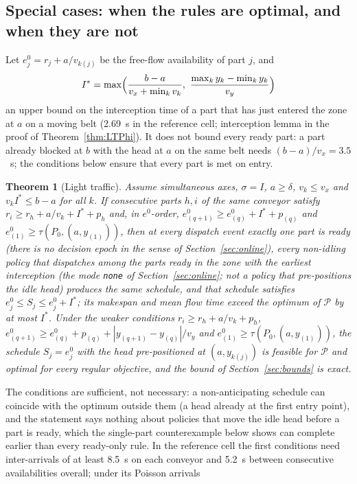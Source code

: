 \documentclass[11pt,a4paper]{article}
\theoremstyle{plain}
\newtheorem{theorem}{Theorem}
\theoremstyle{definition}
\theoremstyle{remark}
\newcommand{\Pb}{\mathcal{P}}
\begin{document}
\subsection{Special cases: when the rules are optimal, and when they are not}\label{sec:special}
Let $e^0_j=r_j+a/v_{k(j)}$ be the free-flow availability of part $j$, and
\[
I^\ast=\max\Bigl(\frac{b-a}{v_x+\min_kv_k},\ \frac{\max_ky_k-\min_ky_k}{v_y}\Bigr)
\]
an upper bound on the interception time of a part that has just entered the zone at $a$
on a moving belt (2.69~s in the reference cell; interception lemma in the proof of
Theorem~\ref{thm:LTPhi}). It does not bound every ready part: a part already blocked at
$b$ with the head at $a$ on the same belt needs $(b-a)/v_x=3.5$~s; the conditions below
ensure that every part is met on entry.
\begin{theorem}[Light traffic]\label{thm:light}
Assume simultaneous axes, $\sigma=I$, $a\ge\delta$, $v_k\le v_x$ and $v_kI^\ast\le b-a$ for
all $k$. If consecutive parts $h,i$ of the same conveyor satisfy
$r_i\ge r_h+a/v_k+I^\ast+p_h$ and, in $e^0$-order, $e^0_{(q+1)}\ge e^0_{(q)}+I^\ast+p_{(q)}$
and $e^0_{(1)}\ge\tau(P_0,(a,y_{(1)}))$, then at every dispatch event exactly one part is
ready (there is no decision epoch in the sense of Section~\ref{sec:online}), every non-idling policy that dispatches among the parts ready in the zone with the
earliest interception (the mode \texttt{none} of Section~\ref{sec:online}; not a policy
that pre-positions the idle head) produces the same schedule, and that schedule satisfies
$e^0_j\le S_j\le e^0_j+I^\ast$; its makespan and mean flow time exceed the optimum of $\Pb$
by at most $I^\ast$. Under the weaker conditions $r_i\ge r_h+a/v_k+p_h$,
$e^0_{(q+1)}\ge e^0_{(q)}+p_{(q)}+|y_{(q+1)}-y_{(q)}|/v_y$ and
$e^0_{(1)}\ge\tau(P_0,(a,y_{(1)}))$, the schedule $S_j=e^0_j$ with
the head pre-positioned at $(a,y_{k(j)})$ is feasible for $\Pb$ and optimal for every
regular objective, and the bound of Section~\ref{sec:bounds} is exact.
\end{theorem}
The conditions are sufficient, not necessary: a non-anticipating schedule can coincide
with the optimum outside them (a head already at the first entry point), and the
statement says nothing about policies that move the idle head before a part is ready,
which the single-part counterexample below shows can complete earlier than every
ready-only rule.
In the reference cell the first conditions need inter-arrivals of at least 8.5~s on each
conveyor and 5.2~s between consecutive availabilities overall; under its Poisson arrivals
\end{document}
